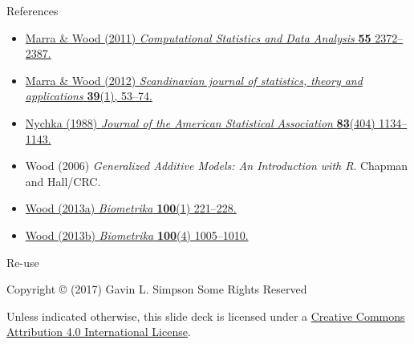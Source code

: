 \documentclass[10pt,ignorenonframetext,compress, aspectratio=169]{beamer}
\providecommand{\tightlist}{%
  \setlength{\itemsep}{0pt}\setlength{\parskip}{0pt}}
\begin{document}
\begin{frame}{References}

\begin{itemize}
\tightlist
\item
  \href{http://doi.org/10.1016/j.csda.2011.02.004}{Marra \& Wood (2011)
  \emph{Computational Statistics and Data Analysis} \textbf{55}
  2372--2387.}
\item
  \href{http://doi.org/10.1111/j.1467-9469.2011.00760.x.}{Marra \& Wood
  (2012) \emph{Scandinavian journal of statistics, theory and
  applications} \textbf{39}(1), 53--74.}
\item
  \href{http://doi.org/10.1080/01621459.1988.10478711}{Nychka (1988)
  \emph{Journal of the American Statistical Association}
  \textbf{83}(404) 1134--1143.}
\item
  Wood (2006) \emph{Generalized Additive Models: An Introduction with
  R}. Chapman and Hall/CRC.
\item
  \href{http://doi.org/10.1093/biomet/ass048}{Wood (2013a)
  \emph{Biometrika} \textbf{100}(1) 221--228.}
\item
  \href{http://doi.org/10.1093/biomet/ast038}{Wood (2013b)
  \emph{Biometrika} \textbf{100}(4) 1005--1010.}
\end{itemize}

\end{frame}

\begin{frame}{Re-use}

Copyright © (2017) Gavin L. Simpson Some Rights Reserved

Unless indicated otherwise, this slide deck is licensed under a
\href{http://creativecommons.org/licenses/by/4.0/}{Creative Commons
Attribution 4.0 International License}.

\begin{center}
  \ccby
\end{center}

\end{frame}
\end{document}
